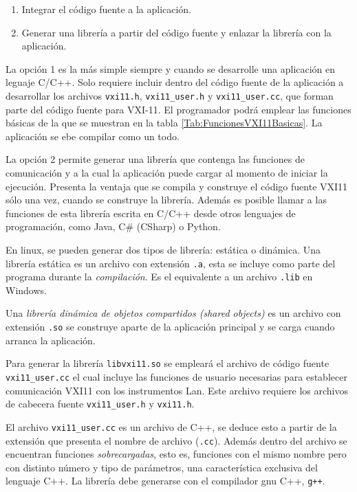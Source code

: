 \documentclass[paper=letter,oneside,fontsize=11pt, parskip=full]{scrartcl}
\begin{document}
	\begin{enumerate}
		\item Integrar el código fuente a la aplicación. 
		\item Generar una librería a partir del código fuente y enlazar la librería con la aplicación.
	\end{enumerate}	

	La opción 1 es la más simple siempre y cuando se desarrolle una aplicación en leguaje C/C++. Solo requiere incluir dentro del código fuente de la aplicación a desarrollar los archivos \texttt{vxi11.h}, \texttt{vxi11\_user.h} y \texttt{vxi11\_user.cc}, que forman parte del código fuente para VXI-11. El programador podrá emplear las funciones básicas de la que se muestran en la tabla \ref{Tab:FuncionesVXI11Basicas}. La aplicación se ebe compilar como un todo.
	
	La opción 2 permite generar una librería que contenga las funciones de comunicación y a la cual la aplicación puede cargar al momento de iniciar la ejecución. Presenta la ventaja que se compila y construye el código fuente VXI11 sólo una vez, cuando se construye la librería. Además es posible llamar a las funciones de esta librería escrita en C/C++ desde otros lenguajes de programación, como Java, C\# (CSharp) o Python.
	
	En linux, se pueden generar dos tipos de librería: estática o dinámica. Una librería estática es un archivo con extensión \texttt{.a}, esta se incluye como parte del programa durante la \emph{compilación}. Es el equivalente a un archivo \texttt{.lib} en Windows.
	
	Una \emph{librería dinámica de objetos compartidos (shared objects)} es un archivo con extensión \texttt{.so} se construye aparte de la aplicación principal y se carga cuando arranca la aplicación.
	
	Para generar la librería \texttt{libvxi11.so} se empleará el archivo de código fuente \texttt{vxi11\_user.cc} el cual incluye las funciones de usuario necesarias para establecer comunicación VXI11 con los instrumentos Lan. Este archivo requiere los archivos de cabecera fuente \texttt{vxi11\_user.h} y \texttt{vxi11.h}. 
	
	El archivo \texttt{vxi11\_user.cc} es un archivo de C++, se deduce esto a partir de la extensión que presenta el nombre de archivo (\texttt{.cc}). Además dentro del archivo se encuentran funciones \emph{sobrecargadas}, esto es, funciones con el mismo nombre pero con distinto número y tipo de parámetros, una característica exclusiva del lenguaje C++. La librería debe generarse con el compilador gnu C++, \texttt{g++}.
	
\end{document}
